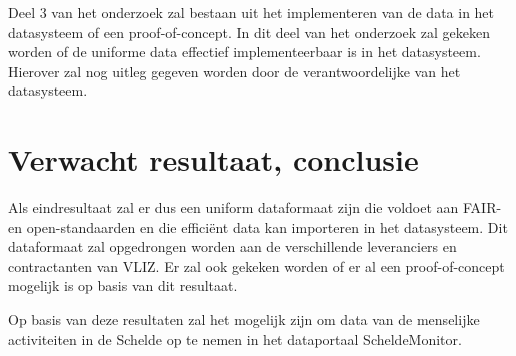 Deel 3 van het onderzoek zal bestaan uit het implementeren van de data in het datasysteem of een proof-of-concept. In dit deel van het onderzoek zal gekeken worden of de uniforme data effectief implementeerbaar is in het datasysteem. Hierover zal nog uitleg gegeven worden door de verantwoordelijke van het datasysteem.

\section{Verwacht resultaat, conclusie}%
\label{sec:verwachte_resultaten}

Als eindresultaat zal er dus een uniform dataformaat zijn die voldoet aan FAIR- en open-standaarden en die efficiënt data kan importeren in het datasysteem. Dit dataformaat zal opgedrongen worden aan de verschillende leveranciers en contractanten van VLIZ. Er zal ook gekeken worden of er al een proof-of-concept mogelijk is op basis van dit resultaat.

Op basis van deze resultaten zal het mogelijk zijn om data van de menselijke activiteiten in de Schelde op te nemen in het dataportaal ScheldeMonitor.

